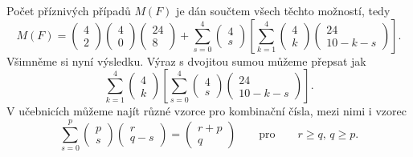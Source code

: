 \begin{example}
    Počet příznivých případů \(M(F)\) je dán součtem všech těchto možností, tedy
    \begin{equation*}
      M(F) = \begin{pmatrix}  4 \\ 2 \end{pmatrix}\begin{pmatrix} 4  \\ 0 \end{pmatrix}
             \begin{pmatrix} 24 \\ 8 \end{pmatrix} + 
              \sum^{4}_{s=0}\begin{pmatrix} 4  \\ s \end{pmatrix}
              \left[\sum^{4}_{k=1}\begin{pmatrix}  4 \\ k \end{pmatrix}
                    \begin{pmatrix} 24 \\ 10 - k - s \end{pmatrix}
              \right].
    \end{equation*}
    Všimněme si nyní výsledku. Výraz s dvojitou sumou můžeme přepsat jak
    \begin{equation*}
      \sum^{4}_{k=1}\begin{pmatrix} 4  \\ k \end{pmatrix}
        \left[\sum^{4}_{s=0}\begin{pmatrix}  4 \\ s \end{pmatrix}
              \begin{pmatrix} 24 \\ 10 - k - s \end{pmatrix}
        \right].
    \end{equation*}
    V učebnicích můžeme najít různé vzorce pro kombinační čísla, mezi nimi i vzorec
    \begin{equation}\label{mai:eq076}
      \sum^{p}_{s=0}\begin{pmatrix} p \\ s \end{pmatrix}\begin{pmatrix} r \\ q - s \end{pmatrix}
        = \begin{pmatrix} r + p \\ q \end{pmatrix} \qquad\text{pro}\qquad r\geq q,\,q \geq p.

\end{equation}
\end{example}
